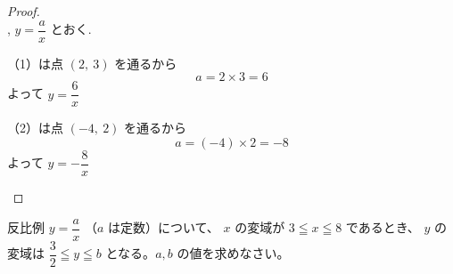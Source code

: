 \begin{proof}\mbox{}\\
    , $y = \dfrac{a}{x}$ とおく.

    \begin{hiddenanswer}
        （1）は点 $(2,\ 3)$ を通るから
        \[a = 2 \times 3 = 6\]
        よって $y = \dfrac{6}{x}$

        （2）は点 $(-4,\ 2)$ を通るから
        \[a = (-4) \times 2 = -8\]
        よって $y = -\dfrac{8}{x}$
    \end{hiddenanswer}
\end{proof}
\newpage

\begin{exercise}
    反比例 $y = \dfrac{a}{x}$ （$a$ は定数）について、 $x$ の変域が $3 \leqq x \leqq 8$ であるとき、 $y$ の変域は $\dfrac{3}{2} \leqq y \leqq b$ となる。$a, b$ の値を求めなさい。
\end{exercise}

